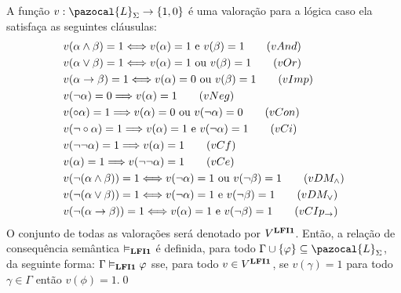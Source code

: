         \begin{definicao} 
            \label{def:valoracoes}
            A função $v : \pazocal{L}_{\Sigma} \to \{1, 0\}$ é uma valoração para a lógica \lfium{} caso ela satisfaça as seguintes cláusulas:
            \begin{align*}
                & v(\alpha \land \beta) = 1 \Longleftrightarrow v(\alpha) = 1 \text{ e } v(\beta) = 1\tag{\textbf{$vAnd$}}\\
                & v(\alpha \lor \beta) = 1 \Longleftrightarrow v(\alpha) = 1 \text{ ou } v(\beta) = 1\tag{\textbf{$vOr$}}\\
                & v(\alpha \to \beta) = 1 \Longleftrightarrow v(\alpha) = 0 \text{ ou } v(\beta) = 1\tag{\textbf{$vImp$}}\\
                & v(\neg \alpha) = 0 \Longrightarrow v(\alpha) = 1\tag{\textbf{$vNeg$}}\\
                & v(\circ \alpha) = 1 \Longrightarrow v(\alpha) = 0 \text{ ou } v(\neg \alpha) = 0\tag{\textbf{$vCon$}}\\
                & v(\neg \circ \alpha) = 1 \Longrightarrow v(\alpha) = 1 \text{ e } v(\neg \alpha) = 1\tag{\textbf{$vCi$}}\\
                & v(\neg \neg \alpha) = 1 \Longrightarrow v(\alpha) = 1\tag{\textbf{$vCf$}}\\
                & v(\alpha) = 1 \Longrightarrow v(\neg \neg \alpha) = 1\tag{\textbf{$vCe$}}\\
                & v(\neg (\alpha \land \beta)) = 1 \Longleftrightarrow v(\neg \alpha) = 1 \text{ ou } v(\neg \beta) = 1\tag{\textbf{$vDM_{\land}$}}\\
                & v(\neg (\alpha \lor \beta)) = 1 \Longleftrightarrow v(\neg \alpha) = 1 \text{ e } v(\neg \beta) = 1\tag{\textbf{$vDM_{\lor}$}}\\
                & v(\neg (\alpha \to \beta)) = 1 \Longleftrightarrow v(\alpha) = 1 \text{ e } v(\neg \beta) = 1\tag{\textbf{$vCIp_{\to}$}}
            \end{align*}
            O conjunto de todas as valorações será denotado por $V^{\textbf{LFI1}{}}$. Então, a relação de consequência semântica $\vDash_{\textbf{LFI1}{}}$ é definida, para todo $\Gamma \cup \{\phi\} \subseteq \pazocal{L}_{\Sigma}$, da seguinte forma: $\Gamma \vDash_{\textbf{LFI1}{}} \varphi$ sse, para todo $v \in V^{\textbf{LFI1}{}}$, se $v(\gamma) = 1$ para todo $\gamma \in \Gamma$ então $v(\phi) = 1$.\qed{}
        \end{definicao}

